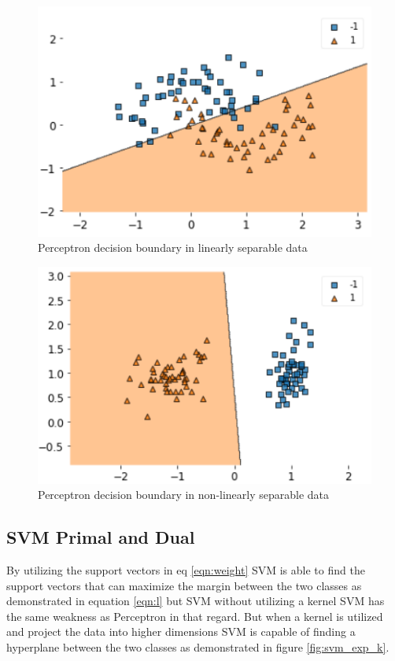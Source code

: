 \documentclass[10pt,twocolumn,letterpaper]{article}
\begin{document}
\begin{figure}[h!]
  \includegraphics[width=\linewidth]{percep_non_lin.png}
  \caption{Perceptron decision boundary in linearly separable data}
  \label{fig:percep_exp_non_lin}
\end{figure}


\begin{figure}[h!]
  \includegraphics[width=\linewidth]{precep_lin.png}
  \caption{Perceptron decision boundary in non-linearly separable data}
  \label{fig:percep_exp_lin}
\end{figure}

\subsection{SVM Primal and Dual}
By utilizing the support vectors in eq \ref{eqn:weight} SVM is able to find the support vectors that can maximize the margin between the two classes as demonstrated in equation \ref{eqn:l} but SVM without utilizing a kernel SVM has the same weakness as Perceptron in that regard. But when a kernel is utilized and project the data into higher dimensions SVM is capable of finding a hyperplane between the two classes as demonstrated in figure \ref{fig:svm_exp_k}.
\end{document}
